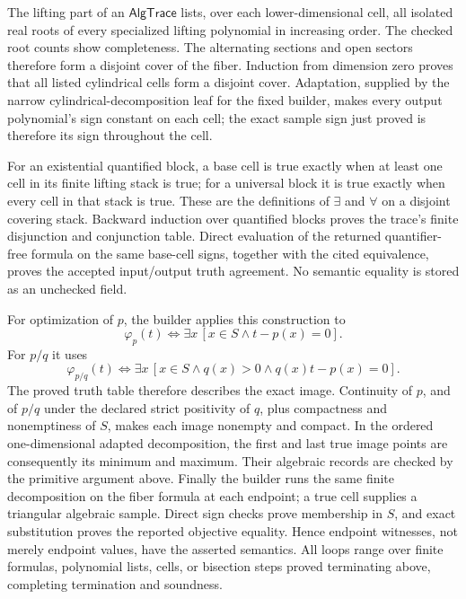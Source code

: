 The lifting part of an \(\mathsf{AlgTrace}\) lists, over each lower-dimensional cell, all isolated real roots of every specialized lifting polynomial in increasing order.  The checked root counts show completeness.  The alternating sections and open sectors therefore form a disjoint cover of the fiber.  Induction from dimension zero proves that all listed cylindrical cells form a disjoint cover.  Adaptation, supplied by the narrow cylindrical-decomposition leaf for the fixed builder, makes every output polynomial's sign constant on each cell; the exact sample sign just proved is therefore its sign throughout the cell.

For an existential quantified block, a base cell is true exactly when at least one cell in its finite lifting stack is true; for a universal block it is true exactly when every cell in that stack is true.  These are the definitions of \(\exists\) and \(\forall\) on a disjoint covering stack.  Backward induction over quantified blocks proves the trace's finite disjunction and conjunction table.  Direct evaluation of the returned quantifier-free formula on the same base-cell signs, together with the cited equivalence, proves the accepted input/output truth agreement.  No semantic equality is stored as an unchecked field.

For optimization of \(p\), the builder applies this construction to
\[
\varphi_p(t)\Longleftrightarrow\exists x\,[x\in S\wedge t-p(x)=0].
\]
For \(p/q\) it uses
\[
\varphi_{p/q}(t)\Longleftrightarrow
\exists x\,[x\in S\wedge q(x)>0\wedge q(x)t-p(x)=0].
\]
The proved truth table therefore describes the exact image.  Continuity of \(p\), and of \(p/q\) under the declared strict positivity of \(q\), plus compactness and nonemptiness of \(S\), makes each image nonempty and compact.  In the ordered one-dimensional adapted decomposition, the first and last true image points are consequently its minimum and maximum.  Their algebraic records are checked by the primitive argument above.  Finally the builder runs the same finite decomposition on the fiber formula at each endpoint; a true cell supplies a triangular algebraic sample.  Direct sign checks prove membership in \(S\), and exact substitution proves the reported objective equality.  Hence endpoint witnesses, not merely endpoint values, have the asserted semantics.  All loops range over finite formulas, polynomial lists, cells, or bisection steps proved terminating above, completing termination and soundness.